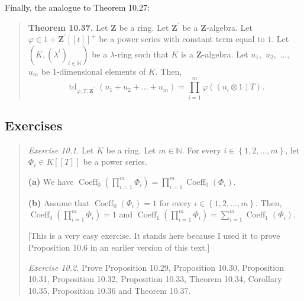 \documentclass[numbers=enddot,12pt,final,onecolumn,notitlepage]{scrartcl}%
\begin{document}
Finally, the analogue to Theorem 10.27:

\begin{quote}
\textbf{Theorem 10.37.} Let $\mathbf{Z}$ be a ring. Let $\mathbf{Z}^{\prime}$
be a $\mathbf{Z}$-algebra. Let $\varphi\in1+\mathbf{Z}^{\prime}\left[  \left[
t\right]  \right]  ^{+}$ be a power series with constant term equal to $1$.
Let $\left(  K,\left(  \lambda^{i}\right)  _{i\in\mathbb{N}}\right)  $ be a
$\lambda$-ring such that $K$ is a $\mathbf{Z}$-algebra. Let $u_{1},$ $u_{2},$
$...,$ $u_{m}$ be $1$-dimensional elements of $K$. Then,%
\[
\operatorname*{td}\nolimits_{\varphi,T,\mathbf{Z}^{\prime}}\left(  u_{1}%
+u_{2}+...+u_{m}\right)  =\prod\limits_{i=1}^{m}\varphi\left(  \left(
u_{i}\otimes1\right)  T\right)  .
\]


\bigskip
\end{quote}

\subsection{Exercises}

\begin{quotation}
\textit{Exercise 10.1.} Let $K$ be a ring. Let $m\in\mathbb{N}$. For every
$i\in\left\{  1,2,...,m\right\}  $, let $\Phi_{i}\in K\left[  \left[
T\right]  \right]  $ be a power series.

\textbf{(a)} We have $\operatorname*{Coeff}\nolimits_{0}\left(  \prod
\limits_{i=1}^{m}\Phi_{i}\right)  =\prod\limits_{i=1}^{m}\operatorname*{Coeff}%
\nolimits_{0}\left(  \Phi_{i}\right)  $.

\textbf{(b)} Assume that $\operatorname*{Coeff}\nolimits_{0}\left(  \Phi
_{i}\right)  =1$ for every $i\in\left\{  1,2,...,m\right\}  $. Then,
$\operatorname*{Coeff}\nolimits_{0}\left(  \prod\limits_{i=1}^{m}\Phi
_{i}\right)  =1$ and $\operatorname*{Coeff}\nolimits_{1}\left(  \prod
\limits_{i=1}^{m}\Phi_{i}\right)  =\sum\limits_{i=1}^{m}\operatorname*{Coeff}%
\nolimits_{1}\left(  \Phi_{i}\right)  $.

[This is a very easy exercise. It stands here because I used it to prove
Proposition 10.6 in an earlier version of this text.]

\textit{Exercise 10.2.} Prove Proposition 10.29, Proposition 10.30,
Proposition 10.31, Proposition 10.32, Proposition 10.33, Theorem 10.34,
Corollary 10.35, Proposition 10.36 and Theorem 10.37.
\end{quotation}

\bigskip

\end{document}

